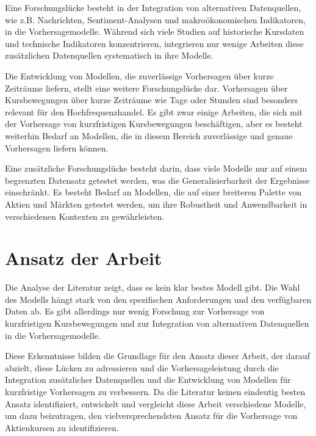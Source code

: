 Eine Forschungslücke besteht in der Integration von alternativen Datenquellen, wie z.B. Nachrichten, Sentiment-Analysen und makroökonomischen Indikatoren, in die Vorhersagemodelle. Während sich viele Studien auf historische Kursdaten und technische Indikatoren konzentrieren, integrieren nur wenige Arbeiten diese zusätzlichen Datenquellen systematisch in ihre Modelle.

Die Entwicklung von Modellen, die zuverlässige Vorhersagen über kurze Zeiträume liefern, stellt eine weitere Forschungslücke dar. Vorhersagen über Kursbewegungen über kurze Zeiträume wie Tage oder Stunden sind besonders relevant für den Hochfrequenzhandel. Es gibt zwar einige Arbeiten, die sich mit der Vorhersage von kurzfristigen Kursbewegungen beschäftigen, aber es besteht weiterhin Bedarf an Modellen, die in diesem Bereich zuverlässige und genaue Vorhersagen liefern können.

Eine zusätzliche Forschungslücke besteht darin, dass viele Modelle nur auf einem begrenzten Datensatz getestet werden, was die Generalisierbarkeit der Ergebnisse einschränkt. Es besteht Bedarf an Modellen, die auf einer breiteren Palette von Aktien und Märkten getestet werden, um ihre Robustheit und Anwendbarkeit in verschiedenen Kontexten zu gewährleisten.

\section{Ansatz der Arbeit}\label{sec:ansatz_der_arbeit}
Die Analyse der Literatur zeigt, dass es kein klar bestes Modell gibt. Die Wahl des Modells hängt stark von den spezifischen Anforderungen und den verfügbaren Daten ab. Es gibt allerdings nur wenig Forschung zur Vorhersage von kurzfristigen Kursbewegungen und zur Integration von alternativen Datenquellen in die Vorhersagemodelle.

Diese Erkenntnisse bilden die Grundlage für den Ansatz dieser Arbeit, der darauf abzielt, diese Lücken zu adressieren und die Vorhersageleistung durch die Integration zusätzlicher Datenquellen und die Entwicklung von Modellen für kurzfristige Vorhersagen zu verbessern. Da die Literatur keinen eindeutig besten Ansatz identifiziert, entwickelt und vergleicht diese Arbeit verschiedene Modelle, um dazu beizutragen, den vielversprechendsten Ansatz für die Vorhersage von Aktienkursen zu identifizieren.
